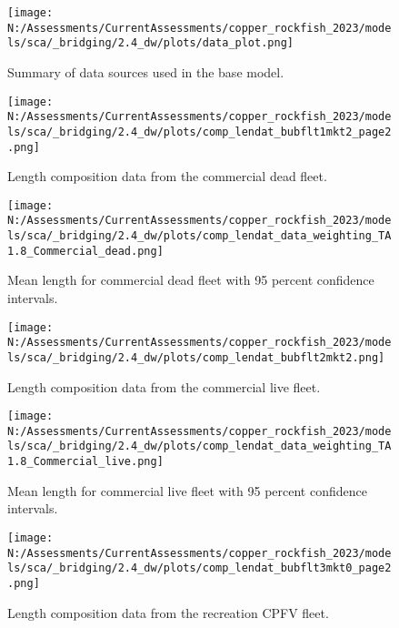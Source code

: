 \documentclass[11pt,
  english,
  letterpaper,
]{article}
\begin{document}
\begin{figure}
\centering
\texttt{[image: N:/Assessments/CurrentAssessments/copper\_rockfish\_2023/models/sca/\_bridging/2.4\_dw/plots/data\_plot.png]}
\caption{Summary of data sources used in the base model.\label{fig:data-plot}}
\end{figure}

\begin{figure}
\centering
\texttt{[image: N:/Assessments/CurrentAssessments/copper\_rockfish\_2023/models/sca/\_bridging/2.4\_dw/plots/comp\_lendat\_bubflt1mkt2\_page2.png]}
\caption{Length composition data from the commercial dead fleet.\label{fig:com-dead-len-data}}
\end{figure}

\begin{figure}
\centering
\texttt{[image: N:/Assessments/CurrentAssessments/copper\_rockfish\_2023/models/sca/\_bridging/2.4\_dw/plots/comp\_lendat\_data\_weighting\_TA1.8\_Commercial\_dead.png]}
\caption{Mean length for commercial dead fleet with 95 percent confidence intervals.\label{fig:mean-com-dead-len-data}}
\end{figure}

\begin{figure}
\centering
\texttt{[image: N:/Assessments/CurrentAssessments/copper\_rockfish\_2023/models/sca/\_bridging/2.4\_dw/plots/comp\_lendat\_bubflt2mkt2.png]}
\caption{Length composition data from the commercial live fleet.\label{fig:com-live-len-data}}
\end{figure}

\begin{figure}
\centering
\texttt{[image: N:/Assessments/CurrentAssessments/copper\_rockfish\_2023/models/sca/\_bridging/2.4\_dw/plots/comp\_lendat\_data\_weighting\_TA1.8\_Commercial\_live.png]}
\caption{Mean length for commercial live fleet with 95 percent confidence intervals.\label{fig:mean-com-live-len-data}}
\end{figure}

\begin{figure}
\centering
\texttt{[image: N:/Assessments/CurrentAssessments/copper\_rockfish\_2023/models/sca/\_bridging/2.4\_dw/plots/comp\_lendat\_bubflt3mkt0\_page2.png]}
\caption{Length composition data from the recreation CPFV fleet.\label{fig:rec-cpfv-len-data}}
\end{figure}
\end{document}
